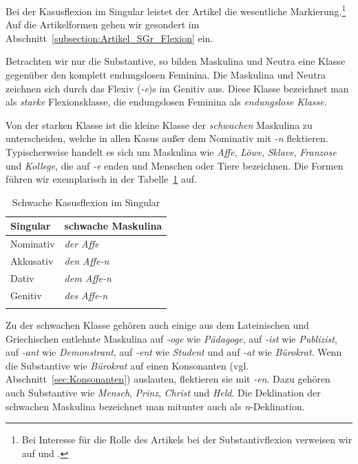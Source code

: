 Bei der Kasusflexion im Singular leistet der Artikel die wesentliche Markierung.\footnote{Bei Interesse für die Rolle des Artikels bei der Substantivflexion verweisen wir auf \citet[160--162]{Wegener1995} und \citet[39--40]{Agel1996}.} Auf die Artikelformen gehen wir gesondert im Abschnitt~\ref{subsection:Artikel_SGr_Flexion} ein.

Betrachten wir nur die Substantive, so bilden Maskulina und Neutra eine Klasse gegenüber den komplett endungslosen Feminina. Die Maskulina und Neutra zeichnen sich durch das Flexiv (\textit{-e})s im Genitiv aus. Diese Klasse bezeichnet man als \textit{starke} Flexionsklasse, die endungslosen Feminina als \textit{endungslose Klasse}.

Von der starken Klasse ist die kleine Klasse der \textit{schwachen} Maskulina zu unterscheiden, welche in allen Kasus außer dem Nominativ mit \textit{-n} flektieren. Typischerweise handelt es sich um Maskulina wie \textit{Affe}, \textit{Löwe}, \textit{Sklave}, \textit{Franzose} und \textit{Kollege}, die auf \textit{-e} enden und Menschen oder Tiere bezeichnen. Die Formen führen wir exemplarisch in der Tabelle~\ref{tab:sw_Kasusflexion_Sgl} auf.

\begin{table}
  \centering
  \begin{tabular}{l l}
    \lsptoprule
    Singular & schwache Maskulina \\
    \hline
    Nominativ & \textit{der Affe} \\
    
    Akkusativ & \textit{den Affe-n} \\
    
    Dativ & \textit{dem Affe-n} \\
    
    Genitiv & \textit{des Affe-n}\\
    \lspbottomrule 
  \end{tabular}
  \caption{Schwache Kasusflexion im Singular}
  \label{tab:sw_Kasusflexion_Sgl}
\end{table}

Zu der schwachen Klasse gehören auch einige aus dem Lateinischen und Griechischen entlehnte Maskulina auf \textit{-oge} wie \textit{Pädagoge}, auf \textit{-ist} wie \textit{Publizist}, auf \textit{-ant} wie \textit{Demonstrant}, auf \textit{-ent} wie \textit{Student} und auf \textit{-at} wie \textit{Bürokrat}. Wenn die Substantive wie \textit{Bürokrat} auf einen Konsonanten (vgl. Abschnitt~\ref{sec:Konsonanten}) auslauten, flektieren sie mit \textit{-en}. Dazu gehören auch Substantive wie \textit{Mensch}, \textit{Prinz}, \textit{Christ} und \textit{Held}. Die Deklination der schwachen Maskulina bezeichnet man mitunter auch als \textit{n}-Deklination. 


